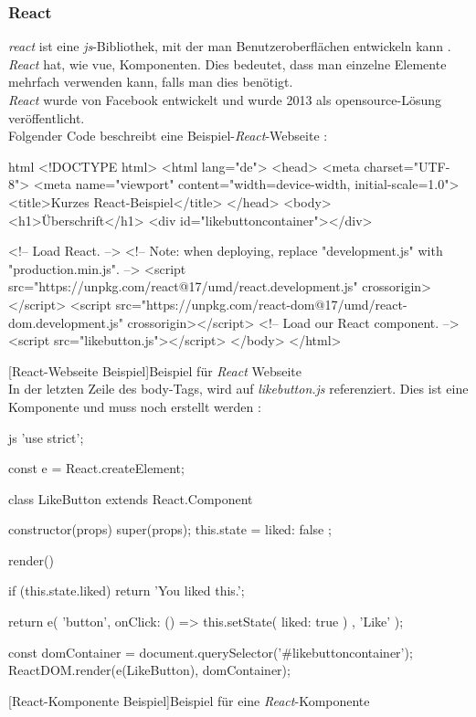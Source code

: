 \subsubsection{React}
\textit{\Gls{react}} ist eine \textit{\Gls{js}}-Bibliothek, mit der man Benutzeroberflächen entwickeln kann \cite{reactdoc}. \textit{React} hat, wie \Gls{vue}, Komponenten. Dies bedeutet, dass man einzelne Elemente mehrfach verwenden kann, falls man dies benötigt.\\
\textit{React} wurde von Facebook entwickelt und wurde 2013 als \Gls{opensource}-Lösung veröffentlicht.\\
Folgender Code beschreibt eine Beispiel-\textit{React}-Webseite \cite{reactdoc}:
\begin{code}{html}
	<!DOCTYPE html>
	<html lang="de">
		<head>
			<meta charset="UTF-8">
			<meta name="viewport" content="width=device-width, initial-scale=1.0">
			<title>Kurzes React-Beispiel</title>
		</head>
		<body>
			<h1>Überschrift</h1>
			<div id="likebuttoncontainer"></div>
			
			<!-- Load React. -->
			<!-- Note: when deploying, replace "development.js" with "production.min.js". -->
			<script src="https://unpkg.com/react@17/umd/react.development.js" crossorigin></script>
			<script src="https://unpkg.com/react-dom@17/umd/react-dom.development.js" crossorigin></script>
			<!-- Load our React component. -->
			<script src="likebutton.js"></script>
		</body>
	</html>
\end{code}
[React-Webseite Beispiel]{Beispiel für \textit{React} Webseite}~\\
\newpage
In der letzten Zeile des body-Tags, wird auf \textit{likebutton.js} referenziert. Dies ist eine Komponente und muss noch erstellt werden \cite{reactdoc}:
\begin{code}{js}
	'use strict';
	
	const e = React.createElement;
	
	class LikeButton extends React.Component {
		constructor(props) {
			super(props);
			this.state = { liked: false };
		}
		
		render() {
			if (this.state.liked) {
				return 'You liked this.';
			}
			
			return e(
			'button',
			{ onClick: () => this.setState({ liked: true }) },
			'Like'
			);
		}
	}
	
	const domContainer = document.querySelector('#likebuttoncontainer');
	ReactDOM.render(e(LikeButton), domContainer);
\end{code}
[React-Komponente Beispiel]{Beispiel für eine \textit{React}-Komponente}
\newpage
